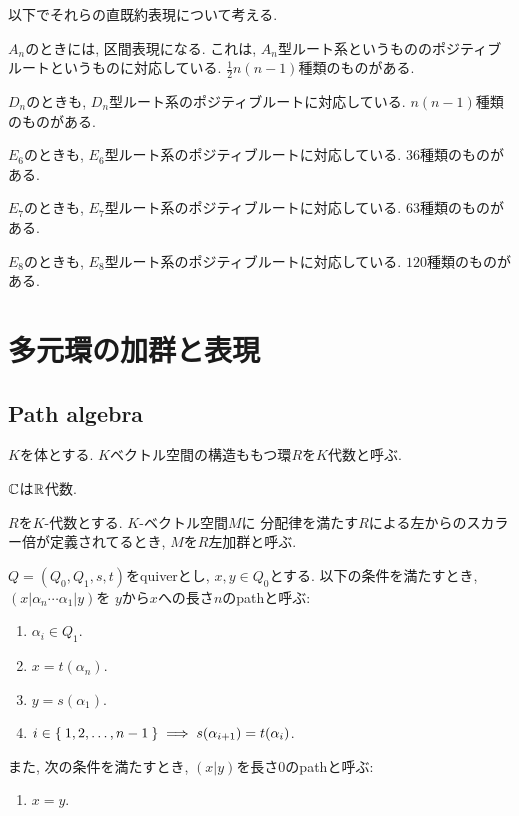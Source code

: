 以下でそれらの直既約表現について考える.
\begin{example}
  $A_n$のときには, 区間表現になる.
  これは, $A_n$型ルート系というもののポジティブルートというものに対応している.
  $\frac{1}{2}n(n-1)$種類のものがある.
\end{example}

\begin{example}
  $D_n$のときも,
  $D_n$型ルート系のポジティブルートに対応している.
  $n(n-1)$種類のものがある.
\end{example}
\begin{example}
  $E_6$のときも,
  $E_6$型ルート系のポジティブルートに対応している.
  $36$種類のものがある.
\end{example}
\begin{example}
  $E_7$のときも,
  $E_7$型ルート系のポジティブルートに対応している.
  $63$種類のものがある.
\end{example}
\begin{example}
  $E_8$のときも,
  $E_8$型ルート系のポジティブルートに対応している.
  $120$種類のものがある.
\end{example}


\chapter{多元環の加群と表現}

\section{Path algebra}
$K$を体とする.
$K$ベクトル空間の構造ももつ環$R$を$K$代数と呼ぶ.
\begin{example}
  $\mathbb{C}$は$\mathbb{R}$代数.
\end{example}
$R$を$K$-代数とする.
$K$-ベクトル空間$M$に
分配律を満たす$R$による左からのスカラー倍が定義されてるとき,
$M$を$R$左加群と呼ぶ.

\begin{definition}
  $Q=(Q_0,Q_1,s,t)$をquiverとし,
  $x,y\in Q_0$とする.
  以下の条件を満たすとき,
  $(x|\alpha_n\cdots\alpha_1|y)$を
  $y$から$x$への長さ$n$のpathと呼ぶ:
  \begin{enumerate}
    \item $\alpha_i\in Q_1$.
    \item $x=t(\alpha_n)$.
    \item $y=s(\alpha_1)$.
    \item $i\in \Set{1,2,\ldots,n-1}\implies s(\alpha_{i+1})=t(\alpha_{i})$.
  \end{enumerate}
  また,
  次の条件を満たすとき,
  $(x|y)$を長さ0のpathと呼ぶ:
  \begin{enumerate}
    \item $x=y$.
  \end{enumerate}
\end{definition}

